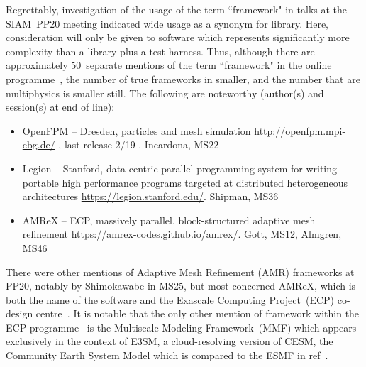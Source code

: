 Regrettably, investigation of the usage of the term ``framework" in
talks at the SIAM~PP20 meeting indicated wide usage as a synonym for library.
Here, consideration will only be given to software which represents
significantly more complexity than a library plus a test harness.
Thus, although there are approximately
$50$~separate mentions of the term ``framework" in the online programme~\cite{pp20},
the number of true frameworks in smaller, and the number that are multiphysics
is smaller still. The following are noteworthy (author(s) and session(s) at end of line):
\begin{itemize}
\item OpenFPM  -- Dresden, particles and mesh simulation \url{http://openfpm.mpi-cbg.de/}
, last release 2/19 . Incardona, MS22
\item Legion  -- Stanford, data-centric parallel programming system for writing portable high performance programs targeted at distributed heterogeneous architectures \url{https://legion.stanford.edu/}. Shipman, MS36
\item AMReX -- ECP, massively parallel, block-structured adaptive mesh refinement \url{https://amrex-codes.github.io/amrex/}. Gott, MS12, Almgren, MS46
\end{itemize}
There were other mentions of Adaptive Mesh Refinement (AMR) frameworks at PP20, notably by Shimokawabe in MS25, but most concerned AMReX, which
is both the name of the software and the Exascale Computing Project~(ECP) co-design centre~\cite[\S\,3]{Al20Exas}. It is notable
that the only other mention of framework within the ECP programme~\cite{Al20Exas} is 
the Multiscale Modeling Framework~(MMF) which appears exclusively
in the context of E3SM, a cloud-resolving version of CESM, the Community Earth System Model
which is compared to the ESMF in ref~\cite{Th16eart}.


